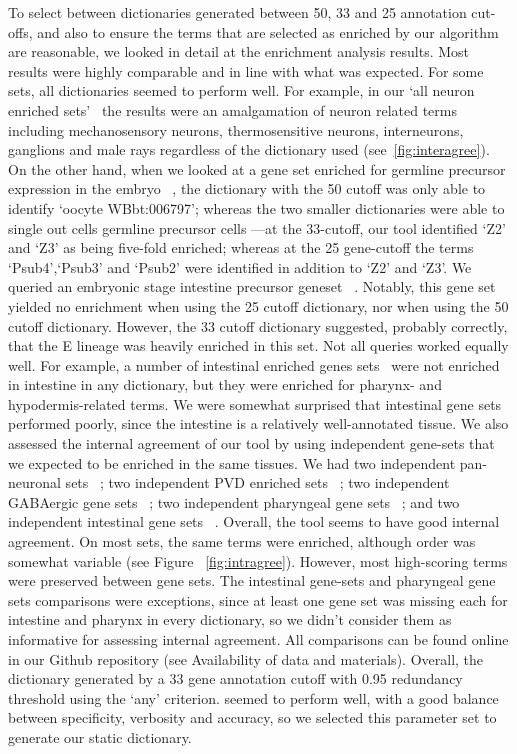 \documentclass{bmcart}
\begin{document}
To select between dictionaries generated between 50, 33 and 25 annotation cut-offs, and also to ensure the terms that are selected as enriched by our algorithm are reasonable, we looked in detail at the enrichment analysis results.
Most results were highly comparable and in line with what was expected. For some sets, all dictionaries seemed to perform well. For example, in our `all neuron enriched sets'~ \cite{Spencer2011, Watson2008a} the results were an amalgamation of neuron related terms including mechanosensory neurons, thermosensitive neurons, interneurons, ganglions and male rays regardless of the dictionary used (see~\ref{fig:interagree}). On the other hand, when we looked at a gene set enriched for germline precursor expression in the embryo~ \cite{Spencer2011}, the dictionary with the 50 cutoff was only able to identify `oocyte WBbt:006797'; whereas the two smaller dictionaries were able to single out cells germline precursor cells ---at the 33-cutoff, our tool identified `Z2' and `Z3' as being five-fold enriched; whereas at the 25 gene-cutoff the terms `Psub4',`Psub3' and `Psub2' were identified in addition to `Z2' and `Z3'.
We queried an embryonic stage intestine precursor geneset~ \cite{Spencer2011}. Notably, this gene set yielded no enrichment when using the 25 cutoff dictionary, nor when using the 50 cutoff dictionary. However, the 33 cutoff dictionary suggested, probably correctly, that the E lineage was heavily enriched in this set.
Not all queries worked equally well. For example, a number of intestinal enriched genes sets~ \cite{Spencer2011, Pauli2006} were not enriched in intestine in any dictionary, but they were enriched for pharynx- and hypodermis-related terms. We were somewhat surprised that intestinal gene sets performed poorly, since the intestine is a relatively well-annotated tissue.
We also assessed the internal agreement of our tool by using independent gene-sets that we expected to be enriched in the same tissues. We had two independent pan-neuronal sets~ \cite{Spencer2011, Watson2008a}; two independent PVD enriched sets~ \cite{Spencer2011, Smith2010}; two independent GABAergic gene sets~ \cite{Spencer2011, Cinar2005}; two independent pharyngeal gene sets~ \cite{Spencer2011, Gaudet2004a}; and two independent intestinal gene sets~ \cite{Spencer2011, Pauli2006}. Overall, the tool seems to have good internal agreement. On most sets, the same terms were enriched, although order was somewhat variable (see Figure ~\ref{fig:intragree}). However, most high-scoring terms were preserved between gene sets. The intestinal gene-sets and pharyngeal gene sets comparisons were exceptions, since at least one gene set was missing each for intestine and pharynx in every dictionary, so we didn't consider them as informative for assessing internal agreement.
 All comparisons can be found online in our Github repository (see Availability of data and materials). Overall, the dictionary generated by a 33 gene annotation cutoff with 0.95 redundancy threshold using the `any' criterion. seemed to perform well, with a good balance between specificity, verbosity and accuracy, so we selected this parameter set to generate our static dictionary.
\end{document}
